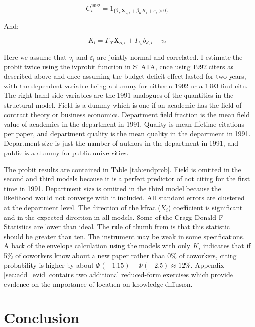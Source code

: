 \documentclass[]{article}
\begin{document}
\begin{equation}
    C^{1992}_i = 1_{\{ \beta_X \mathbf{X}_{o,i} + \beta_K K_i + \varepsilon_i > 0\}}
\end{equation}

And:

\begin{equation}
    K_i = \Gamma_X \mathbf{X}_{o,i} + \Gamma_{b_d} b_{d,i} + v_i
\end{equation}

Here we assume that $v_i$ and $\varepsilon_i$ are jointly normal and
correlated. I estimate the probit twice using the ivprobit function in
STATA, once using 1992 citers as described above and once assuming the
budget deficit effect lasted for two years, with the dependent variable
being a dummy for either a 1992 or a 1993 first cite. The
right-hand-side variables are the 1991 analogues of the quantities in
the structural model. Field is a dummy which is one if an academic has the
field of contract theory or business economics. Department field
fraction is the mean field value of academics in the department in 1991.
Quality is mean lifetime citations per paper, and department quality is
the mean quality in the department in 1991. Department size is just the
number of authors in the department in 1991, and public is a dummy for
public universities. 


The probit results are contained in Table \ref{tab:endprob}.  Field is
omitted in the second and third models
because it is a perfect predictor of not citing for the first time in
1991. Department size is omitted in the third model because the
likelihood would not converge with it included. All standard errors are 
clustered at the department level.  The direction of the
kfrac ($K_i$) coefficient is significant and in the expected direction
in all models. Some of the Cragg-Donald F Statistics are lower than ideal.
The rule of thumb from \citet{staiger1997instrumental} is that this statistic
should be greater than ten.  The instrument may be weak in some specifications.
A back of the envelope calculation using the models with
only $K_i$ indicates that if 5\% of coworkers know
about a new paper rather than 0\% of coworkers, citing probability is higher 
by about $\Phi(-1.15) - \Phi(-2.5) \approx 12\%$.  Appendix \ref{sec:add_evid}
 contains two additional reduced-form exercises which provide
 evidence on the importance of location on knowledge diffusion.

\section{Conclusion}
\end{document}
